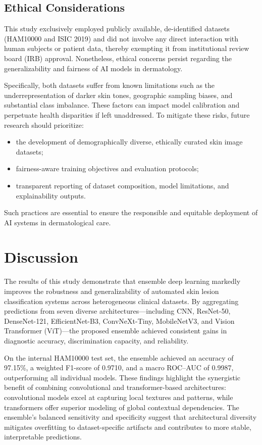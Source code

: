 \documentclass[pdflatex,sn-mathphys-num]{sn-jnl}%
\theoremstyle{thmstyleone}%
\theoremstyle{thmstyletwo}%
\theoremstyle{thmstylethree}%
\begin{document}
\subsection*{Ethical Considerations}

This study exclusively employed publicly available, de-identified datasets (HAM10000 and ISIC 2019) and did not involve any direct interaction with human subjects or patient data, thereby exempting it from institutional review board (IRB) approval. Nonetheless, ethical concerns persist regarding the generalizability and fairness of AI models in dermatology.

Specifically, both datasets suffer from known limitations such as the underrepresentation of darker skin tones, geographic sampling biases, and substantial class imbalance. These factors can impact model calibration and perpetuate health disparities if left unaddressed. To mitigate these risks, future research should prioritize:
\begin{itemize}
    \item the development of demographically diverse, ethically curated skin image datasets;
    \item fairness-aware training objectives and evaluation protocols;
    \item transparent reporting of dataset composition, model limitations, and explainability outputs.
\end{itemize}

Such practices are essential to ensure the responsible and equitable deployment of AI systems in dermatological care.

\section{Discussion}\label{sec10}

The results of this study demonstrate that ensemble deep learning markedly improves the robustness and generalizability of automated skin lesion classification systems across heterogeneous clinical datasets. By aggregating predictions from seven diverse architectures—including CNN, ResNet-50, DenseNet-121, EfficientNet-B3, ConvNeXt-Tiny, MobileNetV3, and Vision Transformer (ViT)—the proposed ensemble achieved consistent gains in diagnostic accuracy, discrimination capacity, and reliability.

On the internal HAM10000 test set, the ensemble achieved an accuracy of 97.15\%, a weighted F1-score of 0.9710, and a macro ROC–AUC of 0.9987, outperforming all individual models. These findings highlight the synergistic benefit of combining convolutional and transformer-based architectures: convolutional models excel at capturing local textures and patterns, while transformers offer superior modeling of global contextual dependencies. The ensemble’s balanced sensitivity and specificity suggest that architectural diversity mitigates overfitting to dataset-specific artifacts and contributes to more stable, interpretable predictions.
\end{document}
